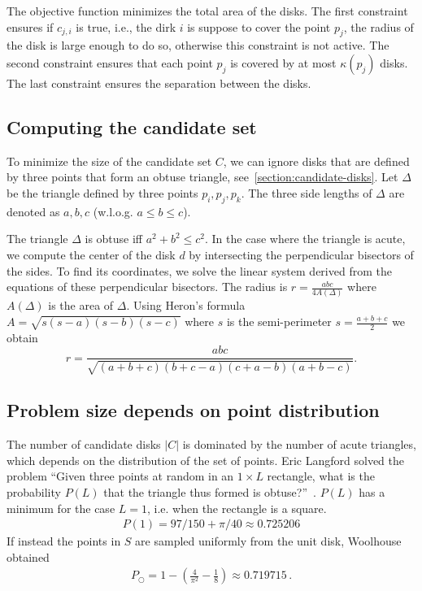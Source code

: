 \documentclass[letterpaper, 10 pt, conference]{ieeeconf}
\newcommand{\points}{S}
\newcommand{\point}{p}
\begin{document}
{The objective function minimizes the total area of the disks.
The first constraint ensures if $c_{j,i}$ is true, i.e., the dirk $i$ is suppose to cover the point $\point_j$, the radius of the disk is large enough to do so, otherwise this constraint is not active.
The second constraint ensures that each point $\point_j$ is covered by at most $\kappa(\point_j)$ disks.
The last constraint ensures the separation between the disks.

\subsection{Computing the candidate set}\label{sec:identiying-acute-triangles}

To minimize the size of the candidate set $C$, we can ignore disks that are defined by three points that form an obtuse triangle, see~\cref{section:candidate-disks}.
Let $\Delta$ be the triangle defined by three points $\point_i,\point_j,\point_k$.
The three side lengths of $\Delta$ are denoted as $a,b,c$ (w.l.o.g. $a\leq b \leq c$).

The triangle $\Delta$ is obtuse iff $a^2 + b^2 \leq c^2$.
In the case where the triangle is acute, we compute the center of the disk $d$ by intersecting the perpendicular bisectors of the sides.
To find its coordinates, we solve the linear system derived from the equations of these perpendicular bisectors.
The radius is $r = \frac{abc}{4A(\Delta)}$
where $A(\Delta)$ is the area of $\Delta$.
Using Heron's formula $
A = \sqrt{s(s-a)(s-b)(s-c)}$
where \( s \) is the semi-perimeter $s = \frac{a + b + c}{2}$ we obtain
\begin{equation*}
    r = \frac{abc}{\sqrt{(a + b + c)(b + c - a)(c + a - b)(a + b - c)}}.
\end{equation*}
\subsection{Problem size depends on point distribution}
The number of candidate disks $|C|$ is dominated by the number of acute triangles, which depends on the distribution of the set of points.
Eric Langford solved the problem ``Given three points at random in an $1\times L$ rectangle, what is the probability $P(L)$ that the triangle thus formed is obtuse?''~\cite{langford1970problem}.
$P(L)$ has a minimum for the case $L=1$, i.e. when the rectangle is a square.
\begin{align*}
    P(1) = 97/150+\pi/40 \approx 0.725206
\end{align*}
If instead the points in $\points$ are sampled uniformly from the unit disk, Woolhouse~\cite{woolhouse1886solution} obtained
\begin{align*}
    P_\bigcirc=1-\left({{\frac{4}{\pi^2}}-{\frac{1}{8}}}\right) \approx 0.719715 \, .
\end{align*}
}

\clearpage
{}


\end{document}
